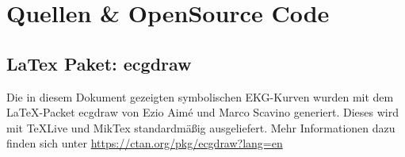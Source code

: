 \section{Quellen \& OpenSource Code}

\subsection{LaTex Paket: ecgdraw}
Die in diesem Dokument gezeigten symbolischen EKG-Kurven wurden mit dem LaTeX-Packet ecgdraw von Ezio Aimé und Marco Scavino generiert. Dieses wird mit TeXLive und MikTex standardmäßig ausgeliefert. Mehr Informationen dazu finden sich unter \url{https://ctan.org/pkg/ecgdraw?lang=en}